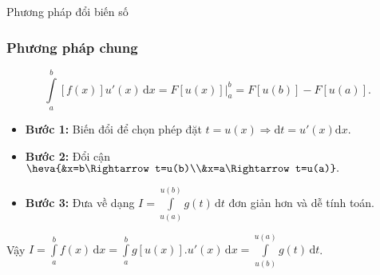 \begin{dang}{Phương pháp đổi biến số}
\subsubsection*{Phương pháp chung}
$$\displaystyle\int\limits_a^b \left [f(x) \right ]u'(x)\mathrm{\,d}x=F\left [u(x) \right ]\bigg|_{a}^b=F\left [u(b) \right]-F\left [u(a) \right ].$$
\begin{itemize}
	\item \textbf{Bước 1:} Biến đổi để chọn phép đặt $t=u(x)\Rightarrow\mathrm{d}t=u'(x)\mathrm{d}x$.
	\item \textbf{Bước 2:} Đổi cận $\heva{&x=b\Rightarrow t=u(b)\\&x=a\Rightarrow t=u(a)}.$
	\item\textbf{Bước 3:} Đưa về dạng $I=\displaystyle\int\limits_{u(a)}^{u(b)} g(t)\mathrm{\,d}t$ đơn giản hơn và dễ tính toán.
\end{itemize}
Vậy $I=\displaystyle\int\limits_{a}^{b}f(x)\,\mathrm{d}x=\displaystyle\int\limits_{a}^{b}g\left[u(x)\right].u'(x)\,\mathrm{d}x=\displaystyle\int\limits_{u(b)}^{u(a)}g(t)\,\mathrm{d}t$.

\end{dang}
